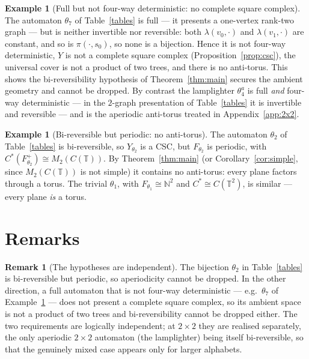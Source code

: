 \documentclass[11pt,reqno]{amsart}
\theoremstyle{plain}
\theoremstyle{definition}
\newtheorem{remark}[theorem]{Remark}
\newtheorem{example}[theorem]{Example}
\newcommand{\NN}{\mathbb{N}}
\begin{document}
\begin{example}[Full but not four-way deterministic: no complete square complex]
\label{ex:lamp}
The automaton $\theta_7$ of Table~\ref{tables} is full --- it presents
a one-vertex rank-two graph --- but is neither invertible nor reversible: both
$\lambda(v_0,\cdot)$ and $\lambda(v_1,\cdot)$ are constant, and so is
$\pi(\cdot,s_0)$, so none is a bijection. Hence it is not four-way deterministic, $Y$
is not a complete square complex (Proposition~\ref{prop:csc}), the universal cover is
not a product of two trees, and there is no anti-torus. This shows the
bi-reversibility hypothesis of Theorem~\ref{thm:main} secures the ambient geometry
and cannot be dropped. By contrast the lamplighter $\theta_4^a$ is full \emph{and}
four-way deterministic --- in the $2$-graph presentation of
Table~\ref{tables} it is invertible and reversible --- and is
the aperiodic anti-torus treated in Appendix~\ref{app:2x2}.
\end{example}

\begin{example}[Bi-reversible but periodic: no anti-torus]
The automaton $\theta_2$ of Table~\ref{tables} is bi-reversible, so
$Y_{\theta_2}$ is a CSC, but $F_{\theta_2}$ is periodic, with
$C^*(F^+_{\theta_2})\cong M_2(C(\mathbb T))$. By Theorem~\ref{thm:main} (or
Corollary~\ref{cor:simple}, since $M_2(C(\mathbb T))$ is not simple) it contains no
anti-torus: every plane factors through a torus. The trivial $\theta_1$, with
$F_{\theta_1}\cong\NN^2$ and $C^*\cong C(\mathbb T^2)$, is similar --- every plane
\emph{is} a torus.
\end{example}

\section{Remarks}

\begin{remark}[The hypotheses are independent]
The bijection $\theta_2$ in Table~\ref{tables} is bi-reversible but periodic, so aperiodicity cannot be dropped. In the
other direction, a full automaton that is not four-way deterministic --- e.g.\
$\theta_7$ of Example~\ref{ex:lamp} --- does not
present a complete square complex, so its ambient space is not a product of two trees
and bi-reversibility cannot be dropped either. The two requirements are logically
independent; at $2\times2$ they are realised separately, the only aperiodic
$2\times2$ automaton (the lamplighter) being itself bi-reversible, so that the
genuinely mixed case appears only for larger alphabets.
\end{remark}
\end{document}
